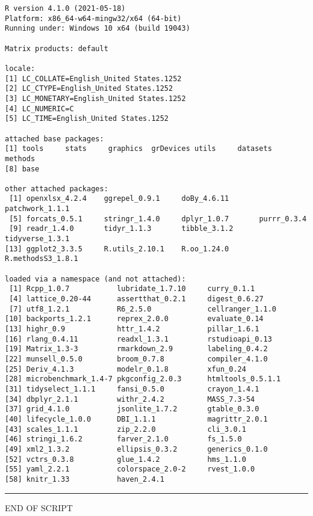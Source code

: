\documentclass[
]{article}
\begin{document}
\begin{verbatim}
R version 4.1.0 (2021-05-18)
Platform: x86_64-w64-mingw32/x64 (64-bit)
Running under: Windows 10 x64 (build 19043)

Matrix products: default

locale:
[1] LC_COLLATE=English_United States.1252 
[2] LC_CTYPE=English_United States.1252   
[3] LC_MONETARY=English_United States.1252
[4] LC_NUMERIC=C                          
[5] LC_TIME=English_United States.1252    

attached base packages:
[1] tools     stats     graphics  grDevices utils     datasets  methods  
[8] base     

other attached packages:
 [1] openxlsx_4.2.4    ggrepel_0.9.1     doBy_4.6.11       patchwork_1.1.1  
 [5] forcats_0.5.1     stringr_1.4.0     dplyr_1.0.7       purrr_0.3.4      
 [9] readr_1.4.0       tidyr_1.1.3       tibble_3.1.2      tidyverse_1.3.1  
[13] ggplot2_3.3.5     R.utils_2.10.1    R.oo_1.24.0       R.methodsS3_1.8.1

loaded via a namespace (and not attached):
 [1] Rcpp_1.0.7           lubridate_1.7.10     curry_0.1.1         
 [4] lattice_0.20-44      assertthat_0.2.1     digest_0.6.27       
 [7] utf8_1.2.1           R6_2.5.0             cellranger_1.1.0    
[10] backports_1.2.1      reprex_2.0.0         evaluate_0.14       
[13] highr_0.9            httr_1.4.2           pillar_1.6.1        
[16] rlang_0.4.11         readxl_1.3.1         rstudioapi_0.13     
[19] Matrix_1.3-3         rmarkdown_2.9        labeling_0.4.2      
[22] munsell_0.5.0        broom_0.7.8          compiler_4.1.0      
[25] Deriv_4.1.3          modelr_0.1.8         xfun_0.24           
[28] microbenchmark_1.4-7 pkgconfig_2.0.3      htmltools_0.5.1.1   
[31] tidyselect_1.1.1     fansi_0.5.0          crayon_1.4.1        
[34] dbplyr_2.1.1         withr_2.4.2          MASS_7.3-54         
[37] grid_4.1.0           jsonlite_1.7.2       gtable_0.3.0        
[40] lifecycle_1.0.0      DBI_1.1.1            magrittr_2.0.1      
[43] scales_1.1.1         zip_2.2.0            cli_3.0.1           
[46] stringi_1.6.2        farver_2.1.0         fs_1.5.0            
[49] xml2_1.3.2           ellipsis_0.3.2       generics_0.1.0      
[52] vctrs_0.3.8          glue_1.4.2           hms_1.1.0           
[55] yaml_2.2.1           colorspace_2.0-2     rvest_1.0.0         
[58] knitr_1.33           haven_2.4.1         
\end{verbatim}

\begin{center}\rule{0.5\linewidth}{0.5pt}\end{center}

END OF SCRIPT
\end{document}
